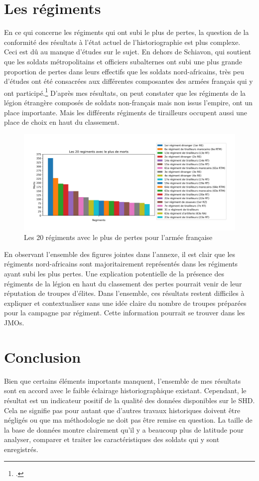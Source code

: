 \section{Les régiments}
En ce qui concerne les régiments qui ont subi le plus de pertes, la question de la conformité des résultats à l'état actuel de l'historiographie est plus complexe. Ceci est dû au manque d’études sur le sujet. En dehors de  Schiavon, qui soutient que les soldats métropolitains et officiers subalternes ont subi une plus grande proportion de pertes dans leurs effectifs que les soldats nord-africains, très peu d’études ont été consacrées aux différentes composantes des armées français qui y ont participé.\footcites[145]{schiavon2016} D'après mes résultats, on peut constater que les régiments de la légion étrangère composés de soldats non-français mais non issus l’empire, ont un place importante. Mais les différents régiments de tirailleurs occupent aussi une place de choix en haut du classement.
\begin{figure}[H]
    \centering
    \includegraphics[scale=0.6]{Images/20regiments.jpg}
    \caption{Les 20 régiments avec le plus de pertes pour l'armée française}
    \label{fig:Morts par régiments}
\end{figure} 
 En observant l’ensemble des figures jointes dans l'annexe, il est clair que les régiments nord-africains sont majoritairement représentés dans les régiments ayant subi les plus pertes. Une explication potentielle de la présence des régiments de la légion en haut du classement des pertes pourrait venir de leur réputation de troupes d’élites. Dans l’ensemble, ces résultats restent difficiles à expliquer et contextualiser sans une idée claire du nombre de troupes préparées pour la campagne par régiment. Cette information pourrait se trouver dans les JMOs.

\section{Conclusion}
Bien que certains éléments importants manquent, l’ensemble de mes résultats sont en accord avec le faible éclairage  historiographique existant. Cependant, le résultat est un indicateur positif de la qualité des données disponibles sur le SHD. Cela ne signifie pas pour autant que d'autres travaux historiques doivent être négligés ou que ma méthodologie ne doit pas être remise en question. La taille  de la base de données montre clairement qu'il y a beaucoup plus de latitude pour analyser, comparer et traiter les caractéristiques des soldats qui y sont enregistrés.   
